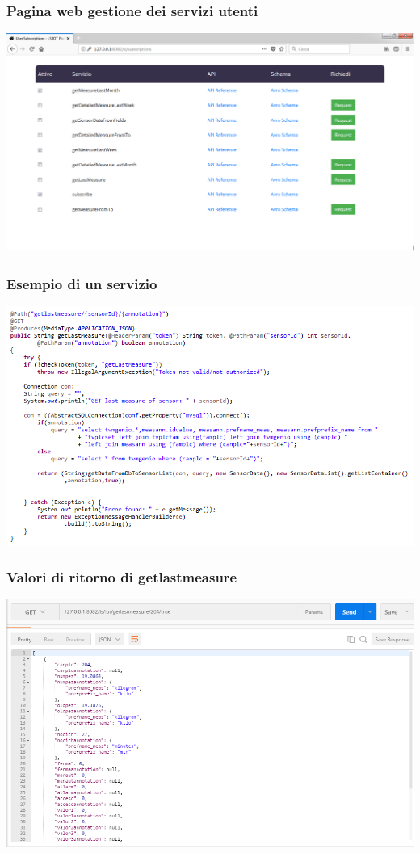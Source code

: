 \documentclass{beamer}
\begin{document}
\begin{frame}
\frametitle{Pagina web gestione dei servizi utenti}
\includegraphics[width=1\textwidth]{images/UserSubscriptionsPlatform.png}
\end{frame}

\begin{frame}
\frametitle{Esempio di un servizio}
\includegraphics[width=1\textwidth]{images/getlastmeasure.png}
\end{frame}

\begin{frame}
\frametitle{Valori di ritorno di getlastmeasure}
\includegraphics[width=1\textwidth]{images/Postman1.png}
\end{frame}
\end{document}
